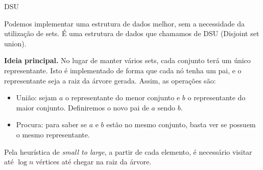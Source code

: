 \begin{frame}{DSU}

    Podemos implementar uma estrutura de dados melhor, sem a necessidade da utilização de sets. É uma estrutura de dados que chamamos de DSU (Disjoint set union).

    {\bf Ideia principal.} No lugar de manter vários sets, cada conjunto terá um único representante. Isto é implementado de forma que cada nó tenha um pai, e o representante seja a raiz da árvore gerada. Assim, as operações são:
    
    \begin{itemize}
        \item União: sejam $a$ o representante do menor conjunto e $b$ o representante do maior conjunto. Definiremos o novo pai de $a$ sendo $b$.
        \item Procura: para saber se $a$ e $b$ estão no mesmo conjunto, basta ver se possuem o mesmo representante.
    \end{itemize}

    Pela heurística de \textit{small to large}, a partir de cada elemento, é necessário visitar até $\log n$ vértices até chegar na raiz da árvore.



\end{frame}
